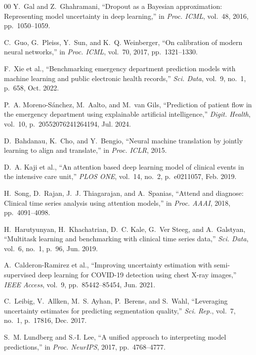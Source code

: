 \documentclass[runningheads]{llncs}
\begin{document}
\begin{thebibliography}{00}
Y.~Gal and Z.~Ghahramani, ``Dropout as a Bayesian approximation: Representing model uncertainty in deep learning,'' in \textit{Proc. ICML}, vol.~48, 2016, pp.~1050--1059.

C.~Guo, G.~Pleiss, Y.~Sun, and K.~Q. Weinberger, ``On calibration of modern neural networks,'' in \textit{Proc. ICML}, vol.~70, 2017, pp.~1321--1330.

F.~Xie et al., ``Benchmarking emergency department prediction models with machine learning and public electronic health records,'' \textit{Sci. Data}, vol.~9, no.~1, p.~658, Oct. 2022.

P.~A. Moreno-S\'{a}nchez, M.~Aalto, and M.~van Gils, ``Prediction of patient flow in the emergency department using explainable artificial intelligence,'' \textit{Digit. Health}, vol.~10, p.~20552076241264194, Jul. 2024.

D.~Bahdanau, K.~Cho, and Y.~Bengio, ``Neural machine translation by jointly learning to align and translate,'' in \textit{Proc. ICLR}, 2015.

D.~A. Kaji et al., ``An attention based deep learning model of clinical events in the intensive care unit,'' \textit{PLOS ONE}, vol.~14, no.~2, p.~e0211057, Feb. 2019.

H.~Song, D.~Rajan, J.~J. Thiagarajan, and A.~Spanias, ``Attend and diagnose: Clinical time series analysis using attention models,'' in \textit{Proc. AAAI}, 2018, pp.~4091--4098.

H.~Harutyunyan, H.~Khachatrian, D.~C. Kale, G.~Ver Steeg, and A.~Galstyan, ``Multitask learning and benchmarking with clinical time series data,'' \textit{Sci. Data}, vol.~6, no.~1, p.~96, Jun. 2019.

A.~Calderon-Ramirez et al., ``Improving uncertainty estimation with semi-supervised deep learning for COVID-19 detection using chest X-ray images,'' \textit{IEEE Access}, vol.~9, pp.~85442--85454, Jun. 2021.

C.~Leibig, V.~Allken, M.~S. Ayhan, P.~Berens, and S.~Wahl, ``Leveraging uncertainty estimates for predicting segmentation quality,'' \textit{Sci. Rep.}, vol.~7, no.~1, p.~17816, Dec. 2017.

S.~M. Lundberg and S.-I. Lee, ``A unified approach to interpreting model predictions,'' in \textit{Proc. NeurIPS}, 2017, pp.~4768--4777.


\end{thebibliography}
\end{document}
